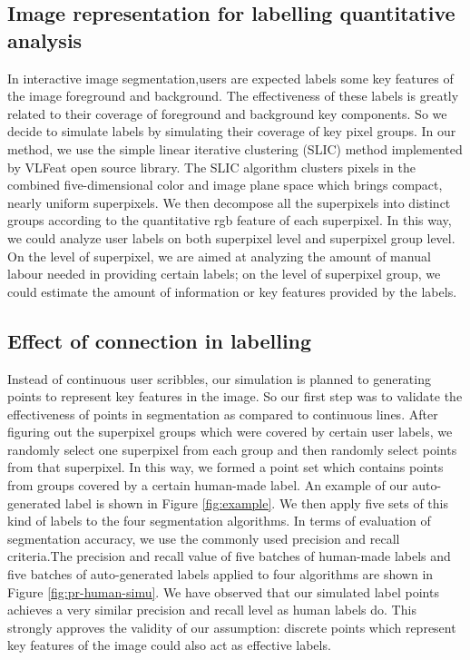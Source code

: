 \documentclass[runningheads,a4paper]{llncs}
\begin{document}
\subsection{Image representation for labelling quantitative analysis}
 In interactive image segmentation,users are expected labels some key features of the image foreground and background. The effectiveness of these labels is greatly related to their coverage of foreground and background key components. So we decide to simulate labels by simulating their coverage of key pixel groups. In our method, we use the simple linear iterative clustering (SLIC)  method \cite{achanta2010slic} implemented by VLFeat open source library\cite{vedaldi08vlfeat}. The SLIC algorithm clusters pixels in the combined five-dimensional color and image plane space which brings compact, nearly uniform superpixels. We then decompose all the superpixels into distinct groups according to the quantitative rgb feature of each superpixel. In this way, we could analyze user labels on both superpixel level and superpixel group level.  On the level of superpixel, we are aimed at analyzing the amount of manual labour needed in providing certain labels; on the level of superpixel group, we could estimate the amount of information or key features provided by the labels.

\subsection{Effect of connection in labelling}
 Instead of continuous user scribbles, our simulation is planned to generating points to represent key features in the image. So our first step was to validate the effectiveness of points in segmentation as compared to continuous lines. After figuring out the superpixel groups which were covered by certain user labels, we randomly select one superpixel from each group and then randomly select points from that superpixel. In this way, we formed a point set which contains points from groups covered by a certain human-made label. An example of our auto-generated label is shown in Figure \ref{fig:example}.  We then apply five sets of this kind of labels to the four segmentation algorithms. In terms of evaluation of segmentation accuracy, we use the commonly used precision and recall criteria.The precision and recall value of five batches of human-made labels and five batches of auto-generated labels applied to four algorithms are shown in Figure \ref{fig:pr-human-simu}. We have observed that our simulated label points achieves a very similar precision and recall level as human labels do. This strongly approves the validity of our assumption: discrete points which represent key features of the image could also act as effective labels.
\end{document}
